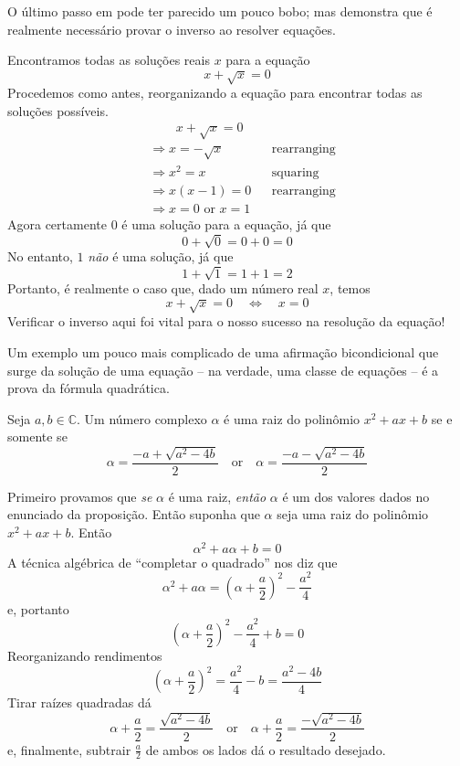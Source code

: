 \begin{itemizar}
O último passo em  pode ter parecido um pouco bobo; mas  demonstra que é realmente necessário provar o inverso ao resolver equações.

\begin{example}
\label{exSolveSqrtSecondExample}
Encontramos todas as soluções reais $x$ para a equação
\[
x+\sqrt{x}=0
\]
Procedemos como antes, reorganizando a equação para encontrar todas as soluções possíveis.
\begin{align*}
&\phantom{\Rightarrow\;\;} x+\sqrt{x} = 0 && \\
&\Rightarrow x=-\sqrt{x} && \text{rearranging} \\
&\Rightarrow x^2=x && \text{squaring} \\
&\Rightarrow x(x-1)=0 && \text{rearranging} \\
&\Rightarrow x=0 \text{ or } x=1 && 
\end{align*}
Agora certamente $0$ é uma solução para a equação, já que
\[
0+\sqrt{0} = 0+0 = 0
\]
No entanto, $1$ \textit{não} é uma solução, já que
\[
1+\sqrt{1} = 1+1 = 2
\]
Portanto, é realmente o caso que, dado um número real $x$, temos
\[
x+\sqrt{x} = 0 \quad \Leftrightarrow \quad x=0
\]
Verificar o inverso aqui foi vital para o nosso sucesso na resolução da equação!
\end{example}

Um exemplo um pouco mais complicado de uma afirmação bicondicional que surge da solução de uma equação – na verdade, uma classe de equações – é a prova da fórmula quadrática.

\begin{itheorem}
\label{thmQuadraticFormula}
Seja $a,b \in \mathbb{C}$. Um número complexo $\alpha$ é uma raiz do polinômio $x^2+ax+b$ se e somente se
\[
\alpha = \frac{-a+\sqrt{a^2-4b}}{2} \quad \text{or} \quad \alpha =\frac{-a-\sqrt{a^2-4b}}{2}
\]
\end{itheorem}

\begin{cproof}
Primeiro provamos que \textit{se} $\alpha$ é uma raiz, \textit{então} $\alpha$ é um dos valores dados no enunciado da proposição. Então suponha que $\alpha$ seja uma raiz do polinômio $x^2+ax+b$. Então
\[
\alpha^2 + a\alpha + b = 0
\]
A técnica algébrica de “completar o quadrado” nos diz que
\[
\alpha^2 + a\alpha = \left( \alpha + \frac{a}{2} \right)^2 - \frac{a^2}{4}
\]
e, portanto
\[
\left( \alpha + \frac{a}{2} \right)^2 - \frac{a^2}{4} + b = 0
\]
Reorganizando rendimentos
\[
\left( \alpha + \frac{a}{2} \right)^2  = \frac{a^2}{4} - b = \frac{a^2-4b}{4}
\]
Tirar raízes quadradas dá
\[
\alpha + \frac{a}{2} = \frac{\sqrt{a^2-4b}}{2} \quad \text{or} \quad \alpha + \frac{a}{2} = \frac{-\sqrt{a^2-4b}}{2}
\]
e, finalmente, subtrair $\frac{a}{2}$ de ambos os lados dá o resultado desejado.


\end{cproof}
\end{itemizar}
